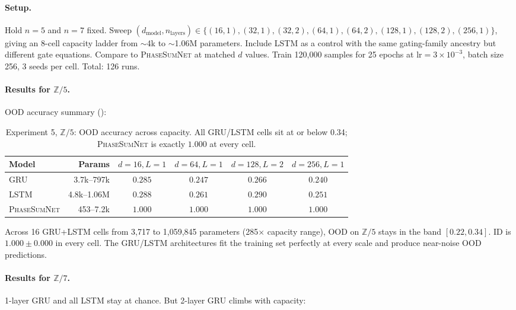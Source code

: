 \documentclass[11pt]{article}
\theoremstyle{definition}
\newcommand{\Z}{\mathbb{Z}}
\begin{document}
\paragraph{Setup.} Hold $n=5$ and $n=7$ fixed. Sweep
$(d_{\text{model}}, n_\text{layers}) \in \{(16,1), (32,1), (32,2),
(64,1), (64,2), (128,1), (128,2), (256,1)\}$, giving an 8-cell
capacity ladder from $\sim$4k to $\sim$1.06M parameters. Include
\textsc{LSTM} as a control with the same gating-family ancestry but
different gate equations. Compare to \textsc{PhaseSumNet} at matched
$d$ values. Train 120{,}000 samples for 25 epochs at $\mathrm{lr} =
3 \times 10^{-3}$, batch size 256, 3 seeds per cell. Total: 126
runs.

\paragraph{Results for $\Z/5$.} OOD accuracy summary
():

\begin{table}[h]
\centering
\caption{Experiment 5, $\Z/5$: OOD accuracy across capacity. All
GRU/LSTM cells sit at or below 0.34; \textsc{PhaseSumNet} is exactly
$1.000$ at every cell.}
\label{tab:exp5-z5}
\setlength{\tabcolsep}{5pt}
\begin{tabular}{l@{\hskip 8pt}rcccc}
\toprule
Model & Params & $d=16,L=1$ & $d=64,L=1$ & $d=128,L=2$ & $d=256,L=1$ \\
\midrule
GRU              & 3.7k--797k   & $0.285$ & $0.247$ & $0.266$ & $0.240$ \\
LSTM             & 4.8k--1.06M  & $0.288$ & $0.261$ & $0.290$ & $0.251$ \\
\textsc{PhaseSumNet} & 453--7.2k & $\mathbf{1.000}$ & $\mathbf{1.000}$ & $\mathbf{1.000}$ & $\mathbf{1.000}$ \\
\bottomrule
\end{tabular}
\end{table}

Across 16 GRU+LSTM cells from 3{,}717 to 1{,}059{,}845 parameters
(285$\times$ capacity range), OOD on $\Z/5$ stays in the band
$[0.22, 0.34]$. ID is $1.000 \pm 0.000$ in every cell. The
GRU/LSTM architectures fit the training set perfectly at every scale
and produce near-noise OOD predictions.

\paragraph{Results for $\Z/7$.} 1-layer GRU and all LSTM stay at
chance. But 2-layer GRU climbs with capacity:
\end{document}

